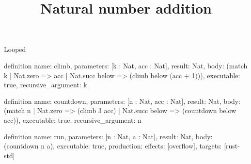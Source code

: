 \begin{lexlean}{Looped}
\title{Natural number addition}
\begin{semanticmodule}
definition{
  name: climb,
  parameters: [k : Nat, acc : Nat],
  result: Nat,
  body: (match k | Nat.zero => acc | Nat.succ below => (climb below (acc + 1))),
  executable: true,
  recursive_argument: k
}

definition{
  name: countdown,
  parameters: [n : Nat, acc : Nat],
  result: Nat,
  body: (match n | Nat.zero => (climb 3 acc) | Nat.succ below => (countdown below acc)),
  executable: true,
  recursive_argument: n
}

definition{
  name: run,
  parameters: [n : Nat, a : Nat],
  result: Nat,
  body: (countdown n a),
  executable: true,
  production: {effects: [overflow], targets: [rust-std]}
}
\end{semanticmodule}
\end{lexlean}
